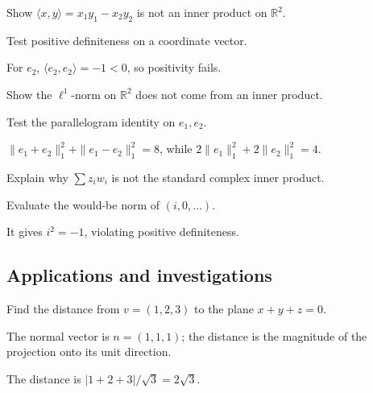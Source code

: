 \begin{exercise}\label{exr:i13-expand-10}
Show \(\langle x,y\rangle=x_1y_1-x_2y_2\) is not an inner product on \(\mathbb R^2\).
\end{exercise}
\begin{hint}
Test positive definiteness on a coordinate vector.
\end{hint}
\begin{solution}
For \(e_2\), \(\langle e_2,e_2\rangle=-1<0\), so positivity fails.
\end{solution}

\begin{exercise}\label{exr:i13-expand-11}
Show the \(\ell^1\)-norm on \(\mathbb R^2\) does not come from an inner product.
\end{exercise}
\begin{hint}
Test the parallelogram identity on \(e_1,e_2\).
\end{hint}
\begin{solution}
\(\|e_1+e_2\|_1^2+\|e_1-e_2\|_1^2=8\), while \(2\|e_1\|_1^2+2\|e_2\|_1^2=4\).
\end{solution}

\begin{exercise}\label{exr:i13-expand-12}
Explain why \(\sum z_iw_i\) is not the standard complex inner product.
\end{exercise}
\begin{hint}
Evaluate the would-be norm of \((i,0,\ldots)\).
\end{hint}
\begin{solution}
It gives \(i^2=-1\), violating positive definiteness.
\end{solution}

\subsection*{Applications and investigations}

\begin{exercise}\label{exr:i13-expand-13}
Find the distance from \(v=(1,2,3)\) to the plane \(x+y+z=0\).
\end{exercise}
\begin{hint}
The normal vector is \(n=(1,1,1)\); the distance is the magnitude of the projection onto its unit direction.
\end{hint}
\begin{solution}
The distance is \(|1+2+3|/\sqrt3=2\sqrt3\).
\end{solution}

